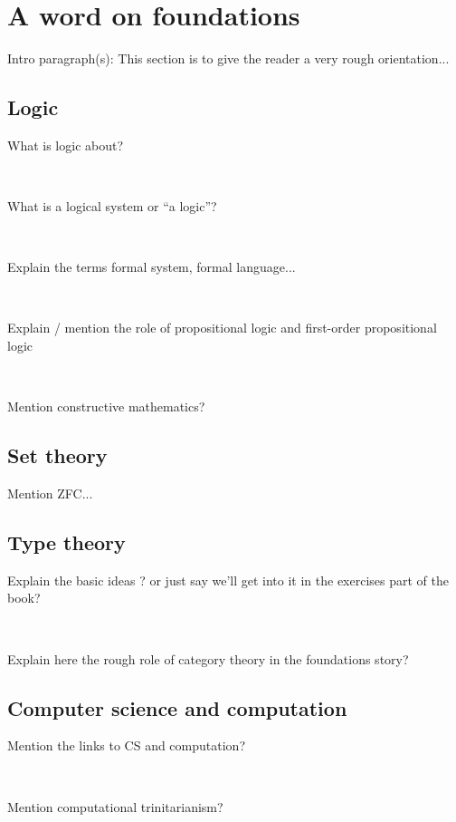 

\section{A word on foundations}



Intro paragraph(s):
This section is to give the reader a very rough orientation... 


\subsection{Logic}

What is logic about?

\

What is a logical system or ``a logic''? 


\

Explain the terms formal system, formal language... 

\

Explain / mention the role of propositional logic and first-order propositional logic


\

Mention constructive mathematics? 

\subsection{Set theory}

Mention ZFC... 



\subsection{Type theory}


Explain the basic ideas ? or just say we'll get into it in the exercises part of the book? 

\


Explain here the rough role of category theory in the foundations story? 


\subsection{Computer science and computation}

Mention the links to CS and computation? 


\

Mention computational trinitarianism?





